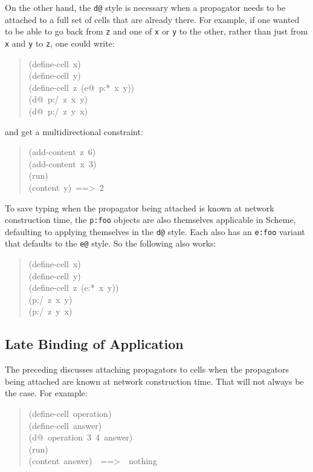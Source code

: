 \documentclass[12pt,letterpaper,english]{article}
\begin{document}
On the other hand, the \texttt{d@} style is necessary when a propagator
needs to be attached to a full set of cells that are already there.
For example, if one wanted to be able to go back from \texttt{z} and one of
\texttt{x} or \texttt{y} to the other, rather than just from \texttt{x} and \texttt{y} to
\texttt{z}, one could write:
\begin{quote}{\ttfamily \raggedright \noindent
(define-cell~x)~\\
(define-cell~y)~\\
(define-cell~z~(e@~p:*~x~y))~\\
(d@~p:/~z~x~y)~\\
(d@~p:/~z~y~x)
}\end{quote}
and get a multidirectional constraint:
\begin{quote}{\ttfamily \raggedright \noindent
(add-content~z~6)~\\
(add-content~x~3)~\\
(run)~\\
(content~y)~==>~2
}\end{quote}

To save typing when the propagator being attached is known at network
construction time, the \texttt{p:foo} objects are also themselves
applicable in Scheme, defaulting to applying themselves in the \texttt{d@}
style.  Each also has an \texttt{e:foo} variant that defaults to the \texttt{e@}
style.  So the following also works:
\begin{quote}{\ttfamily \raggedright \noindent
(define-cell~x)~\\
(define-cell~y)~\\
(define-cell~z~(e:*~x~y))~\\
(p:/~z~x~y)~\\
(p:/~z~y~x)
}\end{quote}



\subsection{Late Binding of Application}
\label{late-binding-of-application}

The preceding discusses attaching propagators to cells when the
propagators being attached are known at network construction time.
That will not always be the case.  For example:
\begin{quote}{\ttfamily \raggedright \noindent
(define-cell~operation)~\\
(define-cell~answer)~\\
(d@~operation~3~4~answer)~\\
(run)~\\
(content~answer)~~==>~~nothing
}\end{quote}
\end{document}
